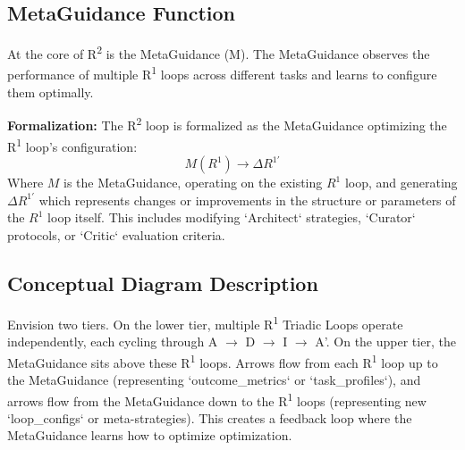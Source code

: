 \documentclass{article}
\begin{document}
\subsection{MetaGuidance Function}
At the core of R\textsuperscript{2} is the MetaGuidance (M). The MetaGuidance observes the performance of multiple R\textsuperscript{1} loops across different tasks and learns to configure them optimally.

\textbf{Formalization:}
The R\textsuperscript{2} loop is formalized as the MetaGuidance optimizing the R\textsuperscript{1} loop's configuration:
$$ M(R^1) \rightarrow \Delta R^{1'} $$
Where $M$ is the MetaGuidance, operating on the existing $R^1$ loop, and generating $\Delta R^{1'}$ which represents changes or improvements in the structure or parameters of the $R^1$ loop itself. This includes modifying `Architect` strategies, `Curator` protocols, or `Critic` evaluation criteria.

\subsection{Conceptual Diagram Description}
Envision two tiers. On the lower tier, multiple R\textsuperscript{1} Triadic Loops operate independently, each cycling through A $\rightarrow$ D $\rightarrow$ I $\rightarrow$ A'. On the upper tier, the MetaGuidance sits above these R\textsuperscript{1} loops. Arrows flow from each R\textsuperscript{1} loop up to the MetaGuidance (representing `outcome_metrics` or `task_profiles`), and arrows flow from the MetaGuidance down to the R\textsuperscript{1} loops (representing new `loop_configs` or meta-strategies). This creates a feedback loop where the MetaGuidance learns how to optimize optimization.
\end{document}
